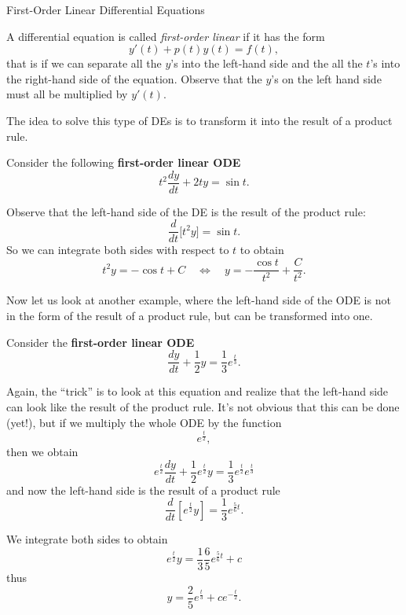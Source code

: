 \begin{submodule}{First-Order Linear Differential Equations}

\begin{definition}
A differential equation is called \emph{first-order linear} if it has the form
$$
y'(t) + p(t) y(t) = f(t),
$$
that is if we can separate all the $y$'s into the left-hand side and the all the $t$'s into the right-hand side of the equation. Observe that the $y$'s on the left hand side must all be multiplied by $y'(t)$. 
\end{definition}


The idea to solve this type of DEs is to transform it into the result of a product rule. \\


\begin{example}
Consider the following \textbf{\color{Red!70!black}first-order linear ODE}
$$
t^2 \frac{dy}{dt} + 2t y = \sin t.
$$

Observe that the left-hand side of the DE is the result of the product rule:
$$
\frac{d}{dt} \bigg[ t^2 y \bigg] = \sin t.
$$
So  we can integrate both sides with respect to $t$ to obtain
$$
t^2 y = - \cos t + C 
\quad \Leftrightarrow \quad y = -\frac{\cos t}{t^2} + \frac{C}{t^2}.
$$
\end{example}


Now let us look at another example, where the left-hand side of the ODE is not in the form of the result of a product rule, but can be transformed into one.


\begin{example}
Consider the \textbf{\color{Red!70!black}first-order linear ODE}
\begin{equation}\tag{$\star$}\label{eq:intfact_1}
\frac{dy}{dt} + \frac12 y = \frac13 e^{\frac t3}.
\end{equation}


Again, the ``trick'' is to look at this equation and realize that the left-hand side can look like the result of the product rule.
It's not obvious that this can be done (yet!), but if we multiply the whole ODE by the function
$$
e^{\frac{t}{2}},
$$
then we obtain
$$
e^{\frac t2} \frac{dy}{dt} + \frac12e^{\frac t2} y = \frac13 e^{\frac t2} e^{\frac t3}
$$
and now the left-hand side is the result of a product rule
$$
\frac{d}{dt}\left[e^{\frac t2} y \right] = \frac13e^{\frac 56 t}.
$$

We integrate both sides to obtain
$$
e^{\frac t2} y = \frac13 \frac65 e^{\frac56 t} + c
$$
thus
$$
y %
	= \frac25 e^{\frac t3} + c e^{-\frac t2}.
$$


\end{example}
\end{submodule}
